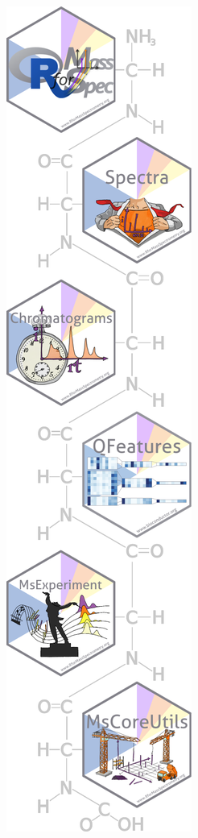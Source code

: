 \documentclass[final]{beamer}
\begin{document}
\begin{frame}[fragile]
\begin{columns}[T]
    \begin{column}{.2\textwidth}
          \begin{figure}
            \centering
            \includegraphics[width=1\linewidth]{./figs/pkgs.pdf}
          \end{figure}


\end{column}
\end{columns}
\end{frame}
\end{document}
